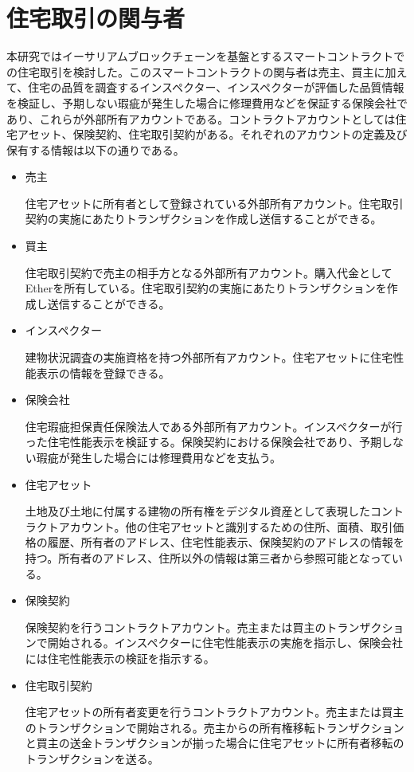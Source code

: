 \documentclass[a4paper,fontsize=11pt,report,notitlepage,line_length=38zw,number_of_lines=40,dvipdfmx]{jlreq}
\begin{document}
\section{住宅取引の関与者}
本研究ではイーサリアムブロックチェーンを基盤とするスマートコントラクトでの住宅取引を検討した。このスマートコントラクトの関与者は売主、買主に加えて、住宅の品質を調査するインスペクター、インスペクターが評価した品質情報を検証し、予期しない瑕疵が発生した場合に修理費用などを保証する保険会社であり、これらが外部所有アカウントである。コントラクトアカウントとしては住宅アセット、保険契約、住宅取引契約がある。それぞれのアカウントの定義及び保有する情報は以下の通りである。
\begin{itemize}
	\item 売主
    \par 住宅アセットに所有者として登録されている外部所有アカウント。住宅取引契約の実施にあたりトランザクションを作成し送信することができる。
    \item 買主
    \par 住宅取引契約で売主の相手方となる外部所有アカウント。購入代金としてEtherを所有している。住宅取引契約の実施にあたりトランザクションを作成し送信することができる。
    \item インスペクター
    \par 建物状況調査の実施資格を持つ外部所有アカウント。住宅アセットに住宅性能表示の情報を登録できる。
    \item 保険会社
    \par 住宅瑕疵担保責任保険法人である外部所有アカウント。インスペクターが行った住宅性能表示を検証する。保険契約における保険会社であり、予期しない瑕疵が発生した場合には修理費用などを支払う。
	\item 住宅アセット	
	\par 土地及び土地に付属する建物の所有権をデジタル資産として表現したコントラクトアカウント。他の住宅アセットと識別するための住所、面積、取引価格の履歴、所有者のアドレス、住宅性能表示、保険契約のアドレスの情報を持つ。所有者のアドレス、住所以外の情報は第三者から参照可能となっている。
	\item 保険契約
    \par 保険契約を行うコントラクトアカウント。売主または買主のトランザクションで開始される。インスペクターに住宅性能表示の実施を指示し、保険会社には住宅性能表示の検証を指示する。
    \item 住宅取引契約
    \par 住宅アセットの所有者変更を行うコントラクトアカウント。売主または買主のトランザクションで開始される。売主からの所有権移転トランザクションと買主の送金トランザクションが揃った場合に住宅アセットに所有者移転のトランザクションを送る。
\end{itemize}
\end{document}
